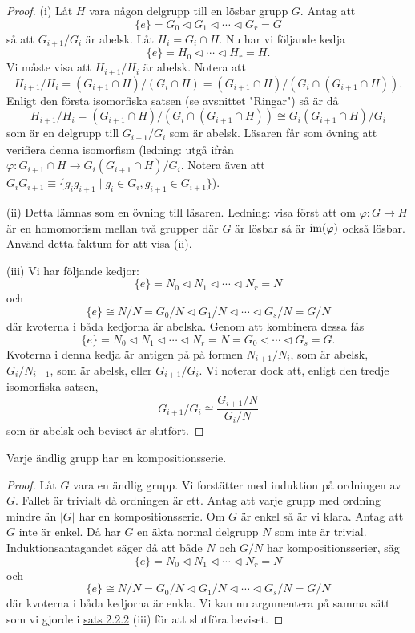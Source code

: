 \documentclass{article}
\newcommand{\im}[0]{\textnormal{im}}
\theoremstyle{definition}
\begin{document}
\begin{proof}
  (i) Låt $H$ vara någon delgrupp till en lösbar grupp $G$. 
  Antag att 
  \[\{e\} = G_0 \triangleleft G_1 \triangleleft \cdots \triangleleft G_r = G\]
  så att $G_{i+1}/G_i$ är abelsk. Låt $H_i = G_i \cap H$. Nu har vi följande kedja 
  \[\{e\} = H_0 \triangleleft \cdots \triangleleft H_r = H.\]
  Vi måste visa att $H_{i+1}/H_i$ är abelsk. Notera att 
  \[H_{i+1}/H_i = (G_{i+1} \cap H)/(G_i \cap H) = (G_{i+1} \cap H)/(G_i \cap (G_{i+1} \cap H)).\]
  Enligt den första isomorfiska satsen (se avsnittet "Ringar") så är då 
  \[H_{i+1}/H_i = (G_{i+1} \cap H)/(G_i \cap (G_{i+1} \cap H)) \cong G_i(G_{i+1} \cap H)/G_i\]
  som är en delgrupp till $G_{i+1}/G_i$ som är abelsk.
  Läsaren får som övning att verifiera denna isomorfism (ledning: utgå ifrån $\varphi: G_{i+1} \cap H \rightarrow G_i(G_{i+1} \cap H)/G_i$.
  Notera även att $G_iG_{i+1} \equiv \{g_ig_{i+1} \; | \; g_i \in G_i, g_{i+1} \in G_{i+1}\}$).

  (ii) Detta lämnas som en övning till läsaren. Ledning: visa först att om $\varphi: G \rightarrow H$ är en homomorfism
  mellan två grupper där $G$ är lösbar så är $\im(\varphi)$ också lösbar. Använd detta faktum för att visa (ii).

  (iii) Vi har följande kedjor: 
  \[\{e\} = N_0 \triangleleft N_1 \triangleleft \cdots \triangleleft N_r = N\]
  och 
  \[\{e\} \cong N/N = G_0/N \triangleleft G_1/N \triangleleft \cdots \triangleleft G_s/N = G/N\]
  där kvoterna i båda kedjorna är abelska. Genom att kombinera dessa fås 
  \[ \{e\} = N_0 \triangleleft N_1 \triangleleft \cdots \triangleleft N_r = N = G_0 \triangleleft \cdots \triangleleft G_s = G.\]
  Kvoterna i denna kedja är antigen på på formen $N_{i+1}/N_i$, som är abelsk, $G_i/N_{i-1}$, som är abelsk, eller $G_{i+1}/G_i$. Vi noterar 
  dock att, enligt den tredje isomorfiska satsen,
  \[G_{i+1}/G_i \cong \frac{G_{i+1}/N}{G_i/N}\]
  som är abelsk och beviset är slutfört.
\end{proof}

\hypertarget{lemma3.2.1}{}
\begin{mylemma}{}{}
  Varje ändlig grupp har en kompositionsserie.
\end{mylemma}

\begin{proof}
  Låt $G$ vara en ändlig grupp. Vi forstätter med induktion på ordningen av $G$. Fallet är trivialt då ordningen är ett. 
  Antag att varje grupp med ordning mindre än $|G|$ har en kompositionsserie. Om $G$ är enkel så är vi klara. Antag att $G$ inte är enkel. 
  Då har $G$ en äkta normal delgrupp $N$ som inte är trivial. Induktionsantagandet säger då att både $N$ och $G/N$ har kompositionsserier, säg 
  \[\{e\} = N_0 \triangleleft N_1 \triangleleft \cdots \triangleleft N_r = N\]
  och 
  \[\{e\} \cong N/N = G_0/N \triangleleft G_1/N \triangleleft \cdots \triangleleft G_s/N = G/N\]
  där kvoterna i båda kedjorna är enkla. Vi kan nu argumentera på samma sätt som vi gjorde i \hyperlink{sats3.2.2}{sats 2.2.2} (iii) för att slutföra beviset.
\end{proof}
\end{document}
